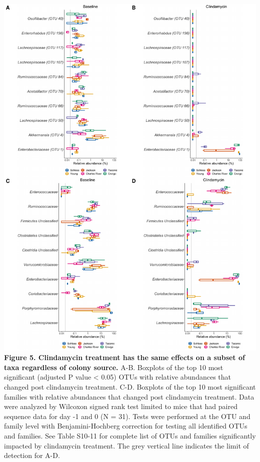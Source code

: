 \documentclass[11pt,]{article}
\begin{document}
\includegraphics{figure_5.pdf} \textbf{Figure 5. Clindamycin treatment
has the same effects on a subset of taxa regardless of colony source.}
A-B. Boxplots of the top 10 most significant (adjusted P value
\textless{} 0.05) OTUs with relative abundances that changed post
clindamycin treatment. C-D. Boxplots of the top 10 most significant
families with relative abundances that changed post clindamycin
treatment. Data were analyzed by Wilcoxon signed rank test limited to
mice that had paired sequence data for day -1 and 0 (N = 31). Tests were
performed at the OTU and family level with Benjamini-Hochberg correction
for testing all identified OTUs and families. See Table S10-11 for
complete list of OTUs and families significantly impacted by clindamycin
treatment. The grey vertical line indicates the limit of detection for
A-D.

\newpage
\end{document}
